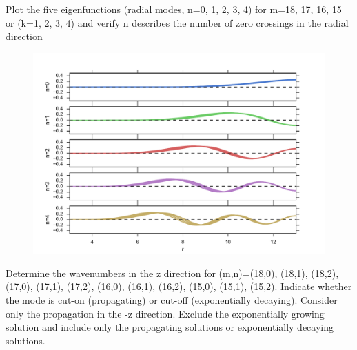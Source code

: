 \documentclass[onecolumn,10pt]{jhwhw}
\begin{document}
\clearpage
\problem{[20 points]}
Plot the five eigenfunctions (radial modes, n=0, 1, 2, 3, 4) for m=18, 17, 16, 15 or (k=1, 2, 3, 4) and verify n describes the number of zero crossings in the radial direction

\begin{figure}[h]
  \centering
  \includegraphics[width=\textwidth]{figs/problem2.pdf}%
\end{figure}

\clearpage
\problem{[20 points]}
Determine the wavenumbers in the z direction for (m,n)=(18,0), (18,1), (18,2), (17,0), (17,1), (17,2), (16,0), (16,1), (16,2), (15,0), (15,1), (15,2). Indicate whether the mode is cut-on (propagating) or cut-off (exponentially decaying). Consider only the propagation in the -z direction. Exclude the exponentially growing solution and include only the propagating solutions or exponentially decaying solutions.
\end{document}
